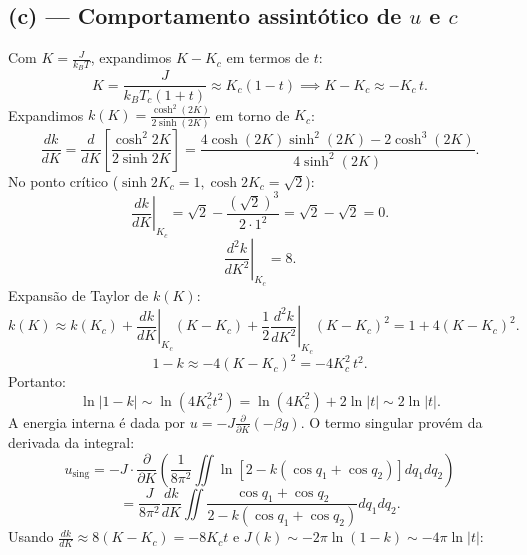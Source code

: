\documentclass[11pt,a4paper]{article}
\begin{document}
\subsection*{(c) --- Comportamento assintótico de $u$ e $c$}
%
Com $K = \frac{J}{k_B T}$, expandimos $K - K_c$ em termos de $t$:
%
\begin{equation}
    K = \frac{J}{k_B T_c (1+t)} \approx K_c (1 - t) \implies K - K_c \approx -K_c \, t.
\end{equation}
%
Expandimos $k(K) = \frac{\cosh^2(2K)}{2\sinh(2K)}$ em torno de $K_c$:
%
\begin{equation}
    \frac{dk}{dK} = \frac{d}{dK}\left[\frac{\cosh^2 2K}{2\sinh 2K}\right] 
    = \frac{4\cosh(2K)\sinh^2(2K) - 2\cosh^3(2K)}{4\sinh^2(2K)}.
\end{equation}
%
No ponto crítico ($\sinh 2K_c = 1, \cosh 2K_c = \sqrt{2}$):
%    
\begin{equation}
    \left.\frac{dk}{dK}\right|_{K_c} = \sqrt{2} - \frac{(\sqrt{2})^3}{2 \cdot 1^2} = \sqrt{2} - \sqrt{2} = 0.
\end{equation}
%
\begin{equation}
    \left.\frac{d^2k}{dK^2}\right|_{K_c} = 8.
\end{equation}
%
Expansão de Taylor de $k(K)$:
%
\begin{equation}
    k(K) \approx k(K_c) + \left.\frac{dk}{dK}\right|_{K_c}(K-K_c) + \frac{1}{2}\left.\frac{d^2k}{dK^2}\right|_{K_c}(K-K_c)^2 = 1 + 4(K-K_c)^2.
    \end{equation}
%    
\begin{equation}
    1 - k \approx -4(K-K_c)^2 = -4 K_c^2 \, t^2.
\end{equation}
%
Portanto:
%
\begin{equation}
    \ln|1-k| \sim \ln(4 K_c^2 t^2) = \ln(4 K_c^2) + 2\ln|t| \sim 2\ln|t|.
\end{equation}
%
A energia interna é dada por $u = -J \frac{\partial}{\partial K} (-\beta g)$. O termo singular provém da derivada da integral:
%
\begin{equation}
    u_{\text{sing}} = -J \cdot \frac{\partial}{\partial K} \left( \frac{1}{8\pi^2} \iint \ln\left[2 - k(\cos q_1 + \cos q_2)\right] dq_1 dq_2 \right)
\end{equation}
%
\begin{equation}
    = \frac{J}{8\pi^2} \frac{dk}{dK} \iint \frac{\cos q_1 + \cos q_2}{2 - k(\cos q_1 + \cos q_2)} dq_1 dq_2.
\end{equation}
%
Usando $\frac{dk}{dK} \approx 8(K-K_c) = -8 K_c t$ e $J(k) \sim -2\pi \ln(1-k) \sim -4\pi \ln|t|$:
\end{document}
